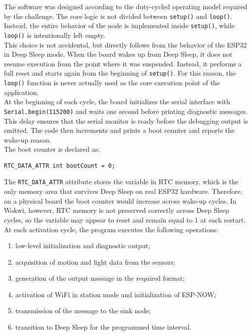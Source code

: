 \documentclass[a4paper,11pt]{article}
\begin{document}
The software was designed according to the duty-cycled operating model required by
the challenge. The core logic is not divided between \texttt{setup()} and
\texttt{loop()}. Instead, the entire behavior of the node is implemented inside
\texttt{setup()}, while \texttt{loop()} is intentionally left empty.\\

This choice is not accidental, but directly follows from the behavior of the ESP32
in Deep Sleep mode. When the board wakes up from Deep Sleep, it does not resume
execution from the point where it was suspended. Instead, it performs a full reset
and starts again from the beginning of \texttt{setup()}. For this reason, the
\texttt{loop()} function is never actually used as the core execution point of the
application.\\

At the beginning of each cycle, the board initializes the serial interface with\\
\texttt{Serial.begin(115200)} and waits one second before printing diagnostic
messages. This delay ensures that the serial monitor is ready before the debugging
output is emitted. The code then increments and prints a boot counter and reports
the wake-up reason.\\

The boot counter is declared as:

\begin{lstlisting}
RTC_DATA_ATTR int bootCount = 0;
\end{lstlisting}

The \texttt{RTC\_DATA\_ATTR} attribute stores the variable in RTC memory, which is
the only memory area that survives Deep Sleep on real ESP32 hardware. Therefore, on a
physical board the boot counter would increase across wake-up cycles. In Wokwi,
however, RTC memory is not preserved correctly across Deep Sleep cycles, so the
variable may appear to reset and remain equal to 1 at each restart.\\

At each activation cycle, the program executes the following operations:
\begin{enumerate}
    \item low-level initialization and diagnostic output;
    \item acquisition of motion and light data from the sensors;
    \item generation of the output message in the required format;
    \item activation of WiFi in station mode and initialization of ESP-NOW;
    \item transmission of the message to the sink node;
    \item transition to Deep Sleep for the programmed time interval.
\end{enumerate}
\end{document}
